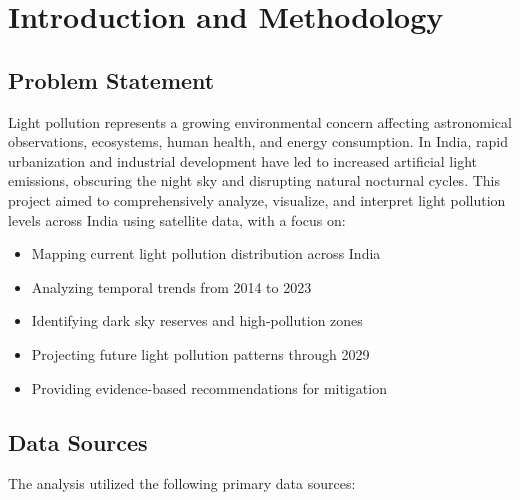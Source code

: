 \documentclass[12pt,a4paper]{article}
\begin{document}
\section{Introduction and Methodology}

\subsection{Problem Statement}
Light pollution represents a growing environmental concern affecting astronomical observations, ecosystems, human health, and energy consumption. In India, rapid urbanization and industrial development have led to increased artificial light emissions, obscuring the night sky and disrupting natural nocturnal cycles. This project aimed to comprehensively analyze, visualize, and interpret light pollution levels across India using satellite data, with a focus on:

\begin{itemize}
    \item Mapping current light pollution distribution across India
    \item Analyzing temporal trends from 2014 to 2023
    \item Identifying dark sky reserves and high-pollution zones
    \item Projecting future light pollution patterns through 2029
    \item Providing evidence-based recommendations for mitigation
\end{itemize}

\subsection{Data Sources}
The analysis utilized the following primary data sources:
\end{document}
